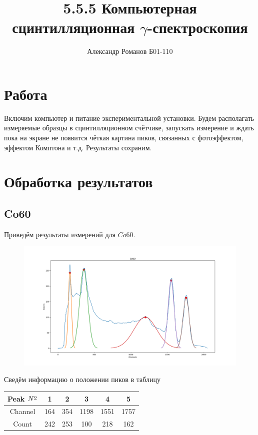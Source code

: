 \documentclass{article}
\author{Александр Романов Б01-110}
\date{}
\title{5.5.5 Компьютерная сцинтилляционная $\gamma$-спектроскопия}
\begin{document}
\maketitle
\section{Работа}
Включим компьютер и питание экспериментальной установки. Будем располагать измеряемые образцы в 
сцинтилляционном счётчике, запускать измерение и ждать пока на экране не появится чёткая картина пиков,
связанных с фотоэффектом, эффектом Комптона и т.д. Результаты сохраним.
\section{Обработка результатов}
\subsection{Co60}
Приведём результаты измерений для \(Co60\).

\begin{figure}[H]
	\includegraphics[width=\textwidth]{Co60.png}
\end{figure}

Сведём информацию о положении пиков в таблицу

\begin{table}[H]
	\centering
	\begin{tabular}{|c|c|c|c|c|c|}
		\hline
		Peak \(N\textsuperscript{\underline{o}}\)& 1 & 2 & 3 & 4 & 5 \\\hline
		Channel & 164 & 354 & 1198 & 1551 & 1757\\\hline
		Count   & 242 & 253 & 100 & 218 & 162\\\hline
	\end{tabular}
\end{table}
\end{document}
